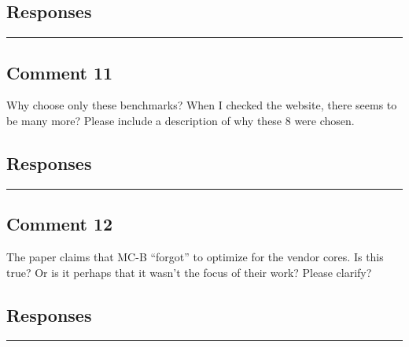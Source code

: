 \documentclass[10pt,journal, compsoc]{IEEEtran}
\begin{document}
\subsection*{Responses}


\noindent\rule[0.25\baselineskip]{252pt}{1pt}

\subsection*{Comment 11}
Why choose only these benchmarks?  When I checked the website, there seems to be many more? Please include a description of why these 8 were chosen.

\subsection*{Responses}


\noindent\rule[0.25\baselineskip]{252pt}{1pt}

\subsection*{Comment 12}
The paper claims that MC-B “forgot” to optimize for the vendor cores.  Is this true?  Or is it perhaps that it wasn’t the focus of their work?  Please clarify?

\subsection*{Responses}


\noindent\rule[0.25\baselineskip]{252pt}{1pt}






\end{document}
